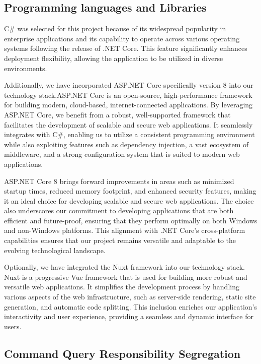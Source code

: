 
\subsection{Programming languages and Libraries}

C\# was selected for this project because of its widespread popularity in
enterprise applications and its capability to operate across various operating
systems following the release of .NET Core. This feature significantly enhances
deployment flexibility, allowing the application to be utilized in diverse
environments. 

Additionally, we have incorporated ASP.NET Core specifically version 8 into our
technology stack.ASP.NET Core is an open-source, high-performance framework for
building modern, cloud-based, internet-connected applications. By leveraging
ASP.NET Core, we benefit from a robust, well-supported framework that
facilitates the development of scalable and secure web applications. It
seamlessly integrates with C\#, enabling us to utilize a consistent programming
environment while also exploiting features such as dependency injection, a vast
ecosystem of middleware, and a strong configuration system that is suited to
modern web applications.

ASP.NET Core 8 brings forward improvements in areas such as minimized startup
times, reduced memory footprint, and enhanced security features, making it an
ideal choice for developing scalable and secure web applications. The choice
also underscores our commitment to developing applications that are both
efficient and future-proof, ensuring that they perform optimally on both Windows
and non-Windows platforms. This alignment with .NET Core’s cross-platform
capabilities ensures that our project remains versatile and adaptable to the
evolving technological landscape.

Optionally, we have integrated the Nuxt framework into our technology stack.
Nuxt is a progressive Vue framework that is used for building more robust and
versatile web applications. It simplifies the development process by handling
various aspects of the web infrastructure, such as server-side rendering, static
site generation, and automatic code splitting. This inclusion enriches our
application's interactivity and user experience, providing a seamless and
dynamic interface for users.

\subsection{Command Query Responsibility Segregation}

